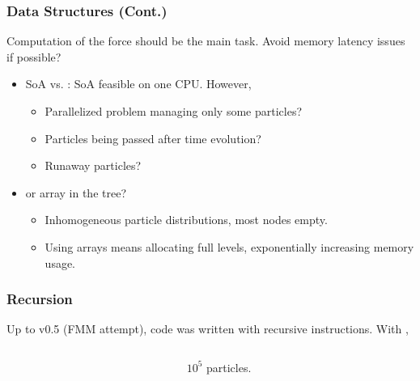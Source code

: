 \begin{frame}
	\frametitle{Data Structures (Cont.)}
	Computation of the force should be the main task. Avoid memory latency issues if possible?
	\begin{itemize}
		\item<1-> SoA vs. : SoA feasible on one CPU. However,
		\begin{itemize}
			\item Parallelized problem managing only some particles?
			\item Particles being passed after time evolution?
			\item Runaway particles?
		\end{itemize}
		\item<2->  or array in the tree?
		\begin{itemize}
			\item Inhomogeneous particle distributions, most nodes empty.
			\item Using arrays means allocating full levels, exponentially increasing memory usage.
		\end{itemize}
	\end{itemize}

\end{frame}

\begin{frame}[t]
\frametitle{Recursion}
Up to v0.5 (FMM attempt), code was written with recursive instructions. With ,
\begin{columns}
	\begin{column}{0.7\textwidth}
		\only<1>{}
		\only<2>{}
	\end{column}
	\begin{column}{0.3\textwidth}
		$10^5$ particles.
		
		
	\end{column}
\end{columns}
\end{frame}

